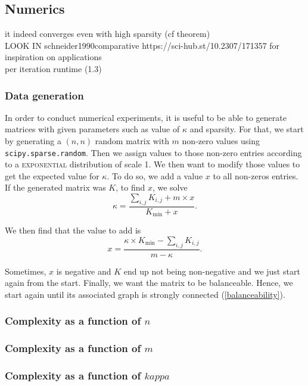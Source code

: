 \subsection{Numerics}

it indeed converges even with high sparsity (cf theorem)\\

LOOK IN {schneider1990comparative} https://sci-hub.st/10.2307/171357 for inspiration on applications\\

per iteration runtime (1.3)

\subsubsection{Data generation}\label{data_genaration}

In order to conduct numerical experiments, it is useful to be able to generate matrices with given parameters such as value of \(\kappa\) and sparsity. For that, we start by generating a \((n,n)\) random matrix with \(m\) non-zero values using \texttt{scipy.sparse.random}. Then we assign values to those non-zero entries according to a \textsc{exponential} distribution of scale 1. We then want to modify those values to get the expected value for \(\kappa\). To do so, we add a value \(x\) to all non-zeros entries. If the generated matrix was \(K\), to find \(x\), we solve 
\[
    \kappa = \dfrac{\sum_{i,j} K_{i,j} + m \times x}{K_{\text{min}} + x}.
\]        

We then find that the value to add is 
\[
    x = \dfrac{\kappa \times K_\text{min} - \sum_{i,j}K_{i,j}}{m - \kappa}.   
\]

Sometimes, \(x\) is negative and \(K\) end up not being non-negative and we just start again from the start. Finally, we want the matrix to be balanceable. Hence, we start again until its associated graph is strongly connected (\cref{balanceability}). 

\subsubsection{Complexity as a function of \(n\)}


\subsubsection{Complexity as a function of \(m\)}


\subsubsection{Complexity as a function of \(kappa\)}

